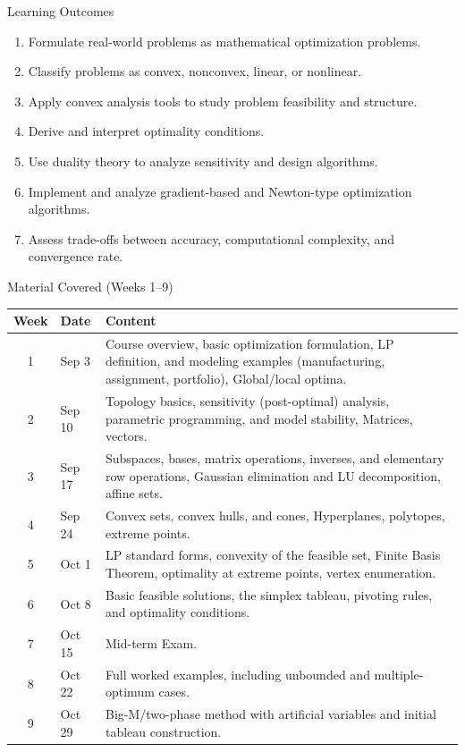 \documentclass[aspectratio=169,hyperref,UTF8,CJK]{beamer}
\begin{document}
\begin{frame}{Learning Outcomes}
  \small
  \begin{enumerate}
    \item Formulate real-world problems as mathematical optimization problems.
    \item Classify problems as convex, nonconvex, linear, or nonlinear.
    \item Apply convex analysis tools to study problem feasibility and structure.
    \item Derive and interpret optimality conditions.
    \item Use duality theory to analyze sensitivity and design algorithms.
    \item Implement and analyze gradient-based and Newton-type optimization algorithms.
    \item Assess trade-offs between accuracy, computational complexity, and convergence rate.
  \end{enumerate}
\end{frame}

\begin{frame}{Material Covered (Weeks 1--9)}
  \scriptsize
  \begin{tabularx}{\textwidth}{@{}c l X@{}}
    \toprule
    Week & Date & Content \\
    \midrule
    1 & Sep 3 & Course overview, basic optimization formulation, LP definition, and modeling examples (manufacturing, assignment, portfolio), Global/local optima. \\
    2 & Sep 10 & Topology basics, sensitivity (post-optimal) analysis, parametric programming, and model stability, Matrices, vectors. \\
    3 & Sep 17 & Subspaces, bases, matrix operations, inverses, and elementary row operations, Gaussian elimination and LU decomposition, affine sets. \\
    4 & Sep 24 & Convex sets, convex hulls, and cones, Hyperplanes, polytopes, extreme points. \\
    5 & Oct 1 & LP standard forms, convexity of the feasible set, Finite Basis Theorem, optimality at extreme points, vertex enumeration. \\
    6 & Oct 8 & Basic feasible solutions, the simplex tableau, pivoting rules, and optimality conditions. \\
    7 & Oct 15 & Mid-term Exam. \\
    8 & Oct 22 & Full worked examples, including unbounded and multiple-optimum cases. \\
    9 & Oct 29 & Big-M/two-phase method with artificial variables and initial tableau construction. \\
    \bottomrule
  \end{tabularx}
\end{frame}
\end{document}
